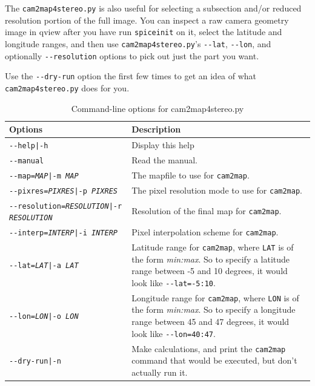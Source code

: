 The \texttt{cam2map4stereo.py} is also useful for selecting a subsection and/or reduced resolution portion of the full image.  You can inspect a raw camera geometry image in qview after you have run \texttt{spiceinit} on it, select the latitude and longitude ranges, and then use \texttt{cam2map4stereo.py}'s \texttt{-\/-lat}, \texttt{-\/-lon}, and optionally \texttt{-\/-resolution} options to pick out just the part you want.

Use the \texttt{-\/-dry-run} option the first few times to get an idea of what \texttt{cam2map4stereo.py} does for you.

\begin{longtable}{|l|p{10cm}|}
\caption{Command-line options for cam2map4stereo.py}
\label{tbl:bundlevis}
\endfirsthead
\endhead
\endfoot
\endlastfoot
\hline
Options & Description \\ \hline \hline
\texttt{-\/-help|-h} & Display this help \\ \hline
\texttt{-\/-manual} & Read the manual. \\ \hline
\texttt{-\/-map=\textit{MAP}|-m \textit{MAP}} & The mapfile to use for \texttt{cam2map}. \\ \hline
\texttt{-\/-pixres=\textit{PIXRES}|-p \textit{PIXRES}} & The pixel resolution mode to use for \texttt{cam2map}. \\ \hline
\texttt{-\/-resolution=\textit{RESOLUTION}|-r \textit{RESOLUTION}} & Resolution of the final map for \texttt{cam2map}. \\ \hline
\texttt{-\/-interp=\textit{INTERP}|-i \textit{INTERP}} & Pixel interpolation scheme for \texttt{cam2map}. \\ \hline
\texttt{-\/-lat=\textit{LAT}|-a \textit{LAT}} & Latitude range for \texttt{cam2map}, where \texttt{LAT} is of the form \textit{min:max}.  So to specify a latitude range between -5 and 10 degrees, it would look like \texttt{-\/-lat=-5:10}. \\ \hline
\texttt{-\/-lon=\textit{LON}|-o \textit{LON}} & Longitude range for \texttt{cam2map}, where \texttt{LON} is of the form \textit{min:max}.  So to specify a longitude range between 45 and 47 degrees, it would look like \texttt{-\/-lon=40:47}. \\ \hline
\texttt{-\/-dry-run|-n} & Make calculations, and print the \texttt{cam2map} command that would be executed, but don't actually run it.\\ \hline
\end{longtable}










